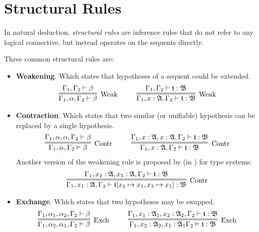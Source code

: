 \section{Structural Rules}

In natural deduction, \textit{structural rules} are inference rules that do not refer to any logical connective, but instead operates on the sequents directly.

Three common structural rules are:
\begin{itemize}
    \item \textbf{Weakening}. Which states that hypotheses of a sequent could be extended.
    \begin{gather*}
        \infer=[\mbox{Weak}]{\Gamma_1, \alpha, \Gamma_2 \vdash \beta}{\Gamma_1, \Gamma_2 \vdash \beta}
        ~~~~ ~~~~
        \infer=[\mbox{Weak}]{\Gamma_1, x : \A, \Gamma_2\vdash \t : \mathfrak{B}}{\Gamma_1, \Gamma_2\vdash \t : \mathfrak{B}}
    \end{gather*}
    \item \textbf{Contraction}. Which states that two similar (or unifiable) hypothesis can be replaced by a single hypothesis.
    \begin{gather*}
        \infer=[\mbox{Contr}]{\Gamma_1, \alpha, \Gamma_2 \vdash \beta}{\Gamma_1, \alpha, \alpha, \Gamma_2 \vdash \beta}
        ~~~~ ~~~~
        \infer=[\mbox{Contr}]{\Gamma_1, x : \A, \Gamma_2 \vdash \t : \mathfrak{B}}{\Gamma_1, x : \A, x : \A, \Gamma_2 \vdash \t : \mathfrak{B}}
    \end{gather*}
    Another version of the weakening rule is proposed by \cite{DavidWalker2004} (in \cite{10.5555/1076265}) for type systems:
    \begin{gather*}
        \infer=[\mbox{Contr}]{\Gamma_1, x_1 : \A, \Gamma_2 \vdash \t[x_2 \mapsto x_1, x_3 \mapsto x_1] : \mathfrak{B}}{\Gamma_1, x_2 : \A, x_3 : \A, \Gamma_2 \vdash \t : \mathfrak{B}}
    \end{gather*}
    \item \textbf{Exchange}. Which states that two hypotheses may be swapped.
    \begin{gather*}
        \infer=[\mbox{Exch}]{\Gamma_1, \alpha_2, \alpha_1, \Gamma_2 \vdash \beta}{\Gamma_1, \alpha_1, \alpha_2, \Gamma_2 \vdash \beta}
        ~~~~ ~~~~
        \infer=[\mbox{Exch}]{\Gamma_1, x_2 : \A_2, x_1 : \A_1 \Gamma_2 \vdash \t : \mathfrak{B}}{\Gamma_1, x_1 : \A_1, x_2 : \A_2, \Gamma_2 \vdash \t : \mathfrak{B}}
    \end{gather*}
\end{itemize}


